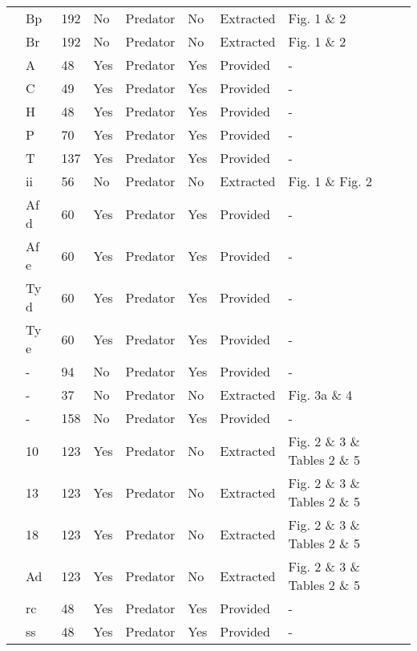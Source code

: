 \begin{longtable}{lllllllll}
\citet{Iyer:1996aa}&Bp&192&No&Predator&No&Extracted&Fig. 1 \& 2&\citet{Novak:2020aa}\tabularnewline
\citet{Iyer:1996aa}&Br&192&No&Predator&No&Extracted&Fig. 1 \& 2&\citet{Novak:2020aa}\tabularnewline
\citet{Kalinkat:2011bd}&A&48&Yes&Predator&Yes&Provided&-&\citet{Kalinkat:2018aa}\tabularnewline
\citet{Kalinkat:2011bd}&C&49&Yes&Predator&Yes&Provided&-&\citet{Kalinkat:2018aa}\tabularnewline
\citet{Kalinkat:2011bd}&H&48&Yes&Predator&Yes&Provided&-&\citet{Kalinkat:2018aa}\tabularnewline
\citet{Kalinkat:2011bd}&P&70&Yes&Predator&Yes&Provided&-&\citet{Kalinkat:2018aa}\tabularnewline
\citet{Kalinkat:2011bd}&T&137&Yes&Predator&Yes&Provided&-&\citet{Kalinkat:2018aa}\tabularnewline
\citet{Krylov:1992aa}&ii&56&No&Predator&No&Extracted&Fig. 1 \& Fig. 2&\citet{Novak:2020aa}\tabularnewline
\citet{Lester:2002aa}&Af d&60&Yes&Predator&Yes&Provided&-&\citet{Lester:2020aa}\tabularnewline
\citet{Lester:2002aa}&Af e&60&Yes&Predator&Yes&Provided&-&\citet{Lester:2020aa}\tabularnewline
\citet{Lester:2002aa}&Ty d&60&Yes&Predator&Yes&Provided&-&\citet{Lester:2020aa}\tabularnewline
\citet{Lester:2002aa}&Ty e&60&Yes&Predator&Yes&Provided&-&\citet{Lester:2020aa}\tabularnewline
\citet{Long:2012ab}&-&94&No&Predator&Yes&Provided&-&\citet{Long:2020ab}\tabularnewline
\citet{Mattila:1998aa}&-&37&No&Predator&No&Extracted&Fig. 3a \& 4&\citet{Novak:2020aa}\tabularnewline
\citet{Nachappa:2006aa}&-&158&No&Predator&Yes&Provided&-&\citet{Nachappa:2006aa}\tabularnewline
\citet{Ranta:1985aa}&10&123&Yes&Predator&No&Extracted&Fig. 2 \& 3 \& Tables 2 \& 5&\citet{Novak:2020aa}\tabularnewline
\citet{Ranta:1985aa}&13&123&Yes&Predator&No&Extracted&Fig. 2 \& 3 \& Tables 2 \& 5&\citet{Novak:2020aa}\tabularnewline
\citet{Ranta:1985aa}&18&123&Yes&Predator&No&Extracted&Fig. 2 \& 3 \& Tables 2 \& 5&\citet{Novak:2020aa}\tabularnewline
\citet{Ranta:1985aa}&Ad&123&Yes&Predator&No&Extracted&Fig. 2 \& 3 \& Tables 2 \& 5&\citet{Novak:2020aa}\tabularnewline
\citet{Wong:2005aa}&rc&48&Yes&Predator&Yes&Provided&-&\citet{Wong:2020ab}\tabularnewline
\citet{Wong:2005aa}&ss&48&Yes&Predator&Yes&Provided&-&\citet{Wong:2020ab}\tabularnewline
\hline
\end{longtable}
